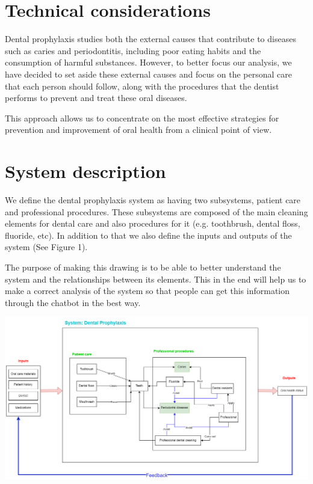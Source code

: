 \documentclass[a0,portrait]{a0poster}
\begin{document}
\begin{mdframed}[style=MyFrame]
\begin{multicols}{2}
\section{Technical considerations}\label{section3}

Dental prophylaxis studies both the external causes that contribute to diseases such as caries and periodontitis, including poor eating habits and the consumption of harmful substances. However, to better focus our analysis, we have decided to set aside these external causes and focus on the personal care that each person should follow, along with the procedures that the dentist performs to prevent and treat these oral diseases.

This approach allows us to concentrate on the most effective strategies for prevention and improvement of oral health from a clinical point of view.

\section{System description}\label{section4}

We define the dental prophylaxis system as having two subsystems, patient care and professional procedures. These subsystems are composed of the main cleaning elements for dental care and also procedures for it (e.g. toothbrush, dental floss, fluoride, etc). In addition to that we also define the inputs and outputs of the system (See Figure 1). 

The purpose of making this drawing is to be able to better understand the system and the relationships between its elements. This in the end will help us to make a correct analysis of the system so that people can get this information through the chatbot in the best way. 
\vspace{2cm}
\vspace{2cm}
\begin{minipage}{\columnwidth}
    \includegraphics[width=0.9\columnwidth]{figures/fig1.png}
\end{minipage}
\vspace{1cm} %



\end{multicols}
\end{mdframed}
\end{document}
